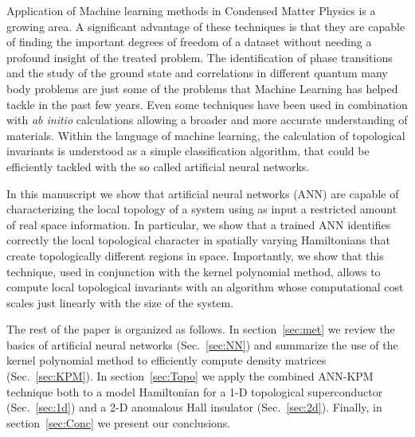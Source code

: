 Application of Machine learning methods in Condensed Matter Physics
is a growing area.
A significant advantage of these techniques is that they are capable of finding the
important degrees of freedom of a dataset without needing a profound insight of
the treated problem.
The identification of phase transitions\cite{VanNieuwenburg2017,PhysRevX.7.031038,ohtsuki2016deep,PhysRevE.95.062122,broecker2017quantum,koch2017mutual}
and the study of the ground state and correlations in different quantum many
body
problems\cite{carleo2017solving,deng2016exact,PhysRevX.7.021021,PhysRevLett.118.216401,nagai2017self,PhysRevE.97.013306}
are just some of the problems that Machine Learning has helped tackle in the
past few years. Even some techniques have been used in combination with
\textit{ab initio} calculations allowing a broader and more accurate
understanding of
materials.\cite{PhysRevLett.108.058301,bartok2017machine,gao2016machine}
Within the language of machine learning, the calculation of topological
invariants is understood as a simple classification algorithm,\cite{PhysRevLett.120.066401,yoshioka2017learning}
that could be
efficiently tackled with the so called artificial neural networks.
\cite{alexnet2012,Dede20107,Lecun1998,Goldberg2015,Bengio2003,pybrain2010jmlr}


In this manuscript we show that artificial neural networks (ANN) are capable of
characterizing the local topology of a system using as input a restricted amount
of real space information.
In particular, we show that a trained ANN identifies correctly the local
topological character in spatially varying Hamiltonians that create
topologically different regions in space.
Importantly, we show that this technique, used in conjunction with the kernel
polynomial method, allows to compute local topological invariants with
an algorithm whose computational cost scales just linearly with the size of the
system.

The rest of the paper is organized as follows. In section~\ref{sec:met} we
review the basics of artificial neural networks (Sec.~\ref{sec:NN}) and
summarize the use of the kernel polynomial method to efficiently compute density
matrices (Sec.~\ref{sec:KPM}).
In section~\ref{sec:Topo} we apply the combined ANN-KPM technique both to a
model Hamiltonian for a 1-D topological superconductor (Sec.~\ref{sec:1d}) and a
2-D anomalous Hall insulator (Sec.~\ref{sec:2d}). Finally, in
section~\ref{sec:Conc} we present our conclusions.




